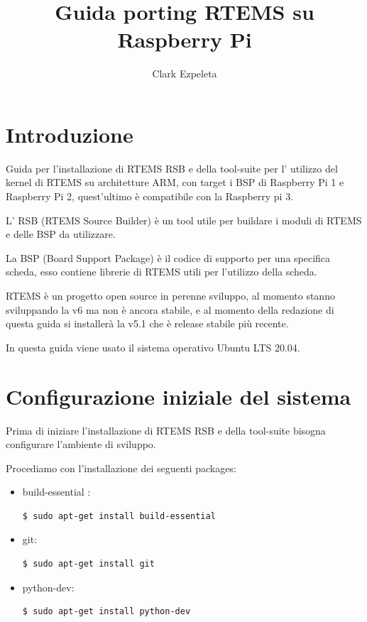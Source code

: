 \documentclass[10pt, a4paper]{article}
\title{Guida porting RTEMS su Raspberry Pi}
\author{Clark Ezpeleta}
\begin{document}
\maketitle
\newpage
\tableofcontents
\newpage
{}
\begin{flushleft}
\section{Introduzione}
Guida per l'installazione di RTEMS RSB e della tool-suite per l' utilizzo del kernel di RTEMS su architetture ARM, con target i BSP di Raspberry Pi 1 e Raspberry Pi 2, quest'ultimo è compatibile con la Raspberry pi 3.

L' RSB (RTEMS Source Builder) è un tool utile per buildare i moduli di RTEMS e delle BSP da utilizzare.

La BSP (Board Support Package) è il codice di supporto per una specifica scheda, esso contiene librerie di RTEMS utili per l'utilizzo della scheda.

RTEMS è un progetto open source in perenne sviluppo, al momento stanno sviluppando la v6 ma non è ancora stabile, e al momento della redazione di questa guida si installerà la v5.1 che è release stabile più recente.

In questa guida viene usato il sistema operativo Ubuntu LTS 20.04.

\newpage
\section{Configurazione iniziale del sistema}
Prima di iniziare l'installazione di RTEMS RSB e della tool-suite bisogna configurare l'ambiente di sviluppo.

Procediamo con l'installazione dei seguenti packages:
\begin{itemize}
\item  build-essential : 
\begin{lstlisting}[language=bash] 
$ sudo apt-get install build-essential
\end{lstlisting}
\item git:
\begin{lstlisting}[language=bash] 
$ sudo apt-get install git
\end{lstlisting}
\item python-dev:
\begin{lstlisting}[language=bash] 
 $ sudo apt-get install python-dev
 \end{lstlisting}
\end{itemize}


\end{flushleft}
\end{document}
